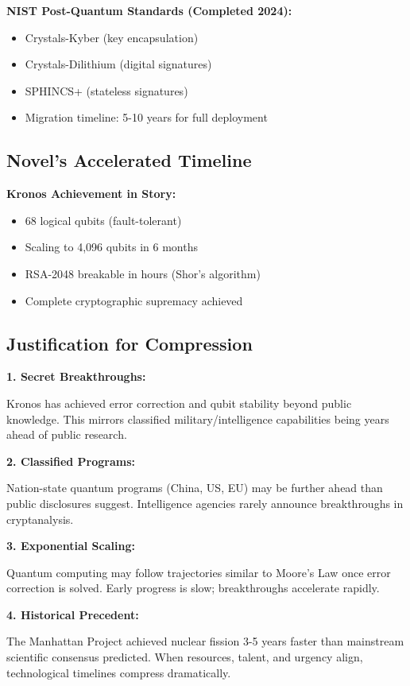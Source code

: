 \documentclass[12pt,oneside]{book}
\begin{document}
\textbf{NIST Post-Quantum Standards (Completed 2024):}
\begin{itemize}
\item Crystals-Kyber (key encapsulation)
\item Crystals-Dilithium (digital signatures)
\item SPHINCS+ (stateless signatures)
\item Migration timeline: 5-10 years for full deployment
\end{itemize}

\subsection{Novel's Accelerated Timeline}

\textbf{Kronos Achievement in Story:}
\begin{itemize}
\item 68 logical qubits (fault-tolerant)
\item Scaling to 4,096 qubits in 6 months
\item RSA-2048 breakable in hours (Shor's algorithm)
\item Complete cryptographic supremacy achieved
\end{itemize}

\subsection{Justification for Compression}

\textbf{1. Secret Breakthroughs:}

Kronos has achieved error correction and qubit stability beyond public knowledge. This mirrors classified military/intelligence capabilities being years ahead of public research.

\textbf{2. Classified Programs:}

Nation-state quantum programs (China, US, EU) may be further ahead than public disclosures suggest. Intelligence agencies rarely announce breakthroughs in cryptanalysis.

\textbf{3. Exponential Scaling:}

Quantum computing may follow trajectories similar to Moore's Law once error correction is solved. Early progress is slow; breakthroughs accelerate rapidly.

\textbf{4. Historical Precedent:}

The Manhattan Project achieved nuclear fission 3-5 years faster than mainstream scientific consensus predicted. When resources, talent, and urgency align, technological timelines compress dramatically.
\end{document}
